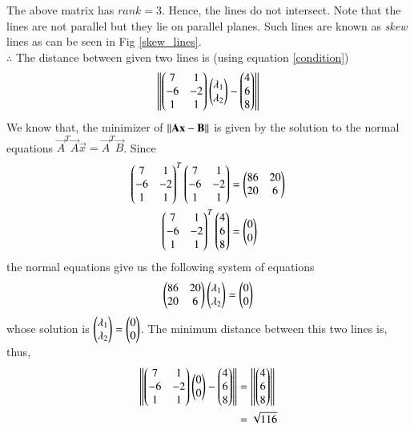 \documentclass[journal,12pt,twocolumn]{IEEEtran}
\begin{document}
The above matrix has $rank = 3$.  Hence, the lines do not intersect.  Note that the lines are not parallel but they  lie on parallel planes.  Such lines are known as {\em skew} lines as can be seen in Fig \ref{skew_lines}.\\
$\therefore$ The distance between given two lines is (using  equation \eqref{condition})
\begin{align}
\left\lVert\begin{pmatrix}7 & 1 \\ -6 & -2 \\ 1 & 1\end{pmatrix}\begin{pmatrix}\lambda_1\\ \lambda_2\end{pmatrix} - \begin{pmatrix}4\\6\\8\end{pmatrix}\right\rVert
\end{align}
We know that, the minimizer of $\left\lVert\mathbf{A}\mathbf{x} - \mathbf{B}\right\rVert$ is given by the solution to the normal equations $\vec{A}^{T}\vec{A}\vec{x} = \vec{A}^{T}\vec{B}$. Since
\begin{align}
\begin{pmatrix}7 & 1 \\ -6 & -2 \\ 1 & 1\end{pmatrix}^{T}\begin{pmatrix}7 & 1 \\ -6 & -2 \\ 1 & 1\end{pmatrix} &= \begin{pmatrix}86 & 20 \\ 20 & 6\end{pmatrix}\\
\begin{pmatrix}7 & 1 \\ -6 & -2 \\ 1 & 1\end{pmatrix}^{T}\begin{pmatrix}4\\6\\8\end{pmatrix} &= \begin{pmatrix}0 \\ 0\end{pmatrix}
\end{align}
the normal equations give us the following system of equations
\begin{align}
\begin{pmatrix}86 & 20 \\ 20 & 6\end{pmatrix}\begin{pmatrix}\lambda_1\\ \lambda_2\end{pmatrix} = \begin{pmatrix}0 \\ 0\end{pmatrix}
\end{align}
whose solution is $\begin{pmatrix}\lambda_1\\ \lambda_2\end{pmatrix} = \begin{pmatrix}0\\ 0\end{pmatrix}$. The minimum distance between this two lines is, thus,
\begin{align}
\left\lVert\begin{pmatrix}7 & 1 \\ -6 & -2 \\ 1 & 1\end{pmatrix}\begin{pmatrix}0 \\ 0\end{pmatrix} - \begin{pmatrix}4\\6\\8\end{pmatrix}\right\rVert &= \left\lVert\begin{pmatrix}4\\6\\8\end{pmatrix}\right\rVert\\
																		 &= \sqrt{116}
\end{align}
\end{document}
